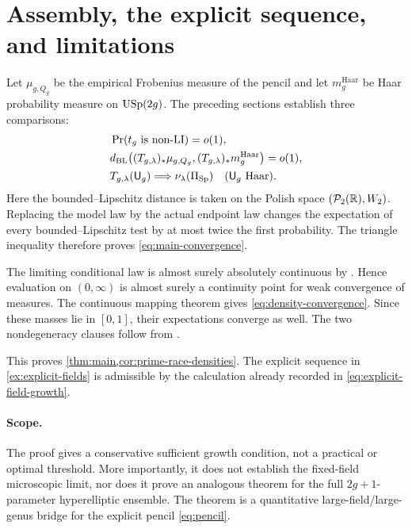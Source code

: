 \section{Assembly, the explicit sequence, and limitations}
\label{sec:assembly}

Let \(\mu_{g,Q_g}\) be the empirical Frobenius measure of the pencil and let
\(m_g^{\mathrm{Haar}}\) be Haar probability measure on \(\mathrm{USp}(2g)\).
The preceding sections establish three comparisons:
\begin{align*}
 &\Pr(t_g\text{ is non-LI})=o(1),\\
 &d_{\mathrm{BL}}
 \bigl((T_{g,\lambda})_*\mu_{g,Q_g},
       (T_{g,\lambda})_*m_g^{\mathrm{Haar}}\bigr)=o(1),\\
 &T_{g,\lambda}(\mathsf U_g)\Longrightarrow\nu_\lambda(\Pi_{\mathrm{Sp}})
 \quad(\mathsf U_g\text{ Haar}).
\end{align*}
Here the bounded--Lipschitz distance is taken on the Polish space
\((\mathcal P_2(\mathbb R),W_2)\).  Replacing the model law by the actual endpoint law changes
the expectation of every bounded--Lipschitz test by at most twice the first
probability.  The triangle inequality
therefore proves \eqref{eq:main-convergence}.

The limiting conditional law is almost surely absolutely continuous by
.  Hence evaluation on \((0,\infty)\) is almost
surely a continuity point for weak convergence of measures.  The continuous
mapping theorem gives \eqref{eq:density-convergence}.  Since these masses lie in \([0,1]\), their
expectations converge as well.  The two nondegeneracy clauses follow from
.

This proves \cref{thm:main,cor:prime-race-densities}.  The explicit sequence in
\cref{ex:explicit-fields} is admissible by the calculation already recorded in
\eqref{eq:explicit-field-growth}.

\paragraph{Scope.}
The proof gives a conservative sufficient growth condition, not a practical or
optimal threshold.  More importantly, it does not establish the fixed-field
microscopic limit, nor does it prove an analogous theorem for the full
\(2g+1\)-parameter hyperelliptic ensemble.  The theorem is a quantitative
large-field/large-genus bridge for the explicit pencil \eqref{eq:pencil}.
